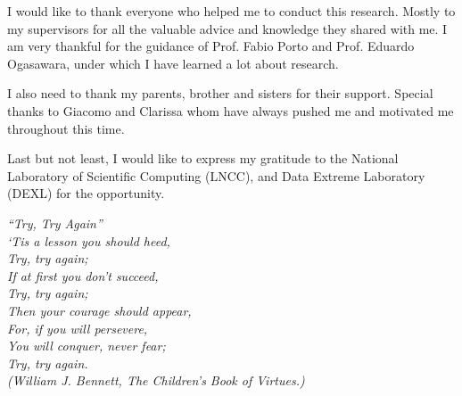 \documentclass[
	final,				%
	12pt,				%
	openright,			%
	oneside,			%
	a4paper,			%
	hyphens,            %
	sumario=tradicional,%
	english,			%
	french,				%
	spanish,			%
	brazil				%
	]{abntex2}
\begin{document}
\begin{agradecimentos}
I would like to thank everyone who helped me to conduct this research. Mostly to my supervisors for all the valuable advice and knowledge they shared with me. I am very thankful for the guidance of Prof. Fabio Porto and Prof. Eduardo Ogasawara, under which I have learned a lot about research.

I also need to thank my parents, brother and sisters for their support. Special thanks to Giacomo and Clarissa whom have always pushed me and motivated me throughout this time.

Last but not least, I would like to express my gratitude to the National Laboratory of Scientific Computing (LNCC), and Data Extreme Laboratory (DEXL) for the opportunity. 

\end{agradecimentos}

\begin{epigrafe}
    \vspace*{\fill}
	\begin{flushright}
		\textit{``Try, Try Again''\\
		`Tis a lesson you should heed, \\
		Try, try again;\\
		If at first you don't succeed,\\
		Try, try again;\\
		Then your courage should appear, \\
		For, if you will persevere, \\
		You will conquer, never fear;\\
		Try, try again.\\
		(William J. Bennett, The Children's Book of Virtues.)}
	\end{flushright}
\end{epigrafe}

\end{document}
